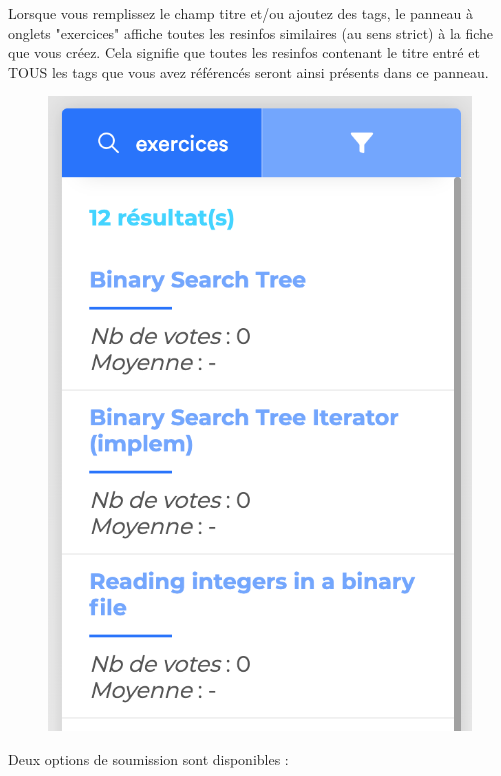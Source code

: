 Lorsque vous remplissez le champ titre et/ou ajoutez des tags, le panneau à onglets "exercices" affiche toutes les \glspl{resinfo} similaires (au sens strict) à la \gls{fiche} que vous créez. Cela signifie que toutes les \glspl{resinfo} contenant le titre entré et TOUS les \glspl{tag} que vous avez référencés seront ainsi présents dans ce panneau.

\begin{figure}[H]
    \includegraphics[width=\textwidth,height=0.3\textheight,keepaspectratio]{images/client/similarity.png}
    \centering
\end{figure}


Deux options de soumission sont disponibles :

